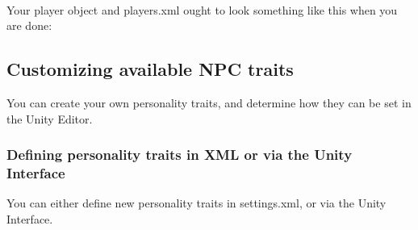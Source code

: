 \documentclass[11pt]{article} %
\begin{document}
~\\
Your player object and players.xml ought to look something like this when you are done:

\begin{figure}[h]
\end{figure}

\newpage
\subsection{Customizing available NPC traits}
You can create your own personality traits, and determine how they can be set in the Unity Editor. 

\subsubsection{Defining personality traits in XML or via the Unity Interface}
You can either define new personality traits in settings.xml, or via the Unity Interface.
\end{document}
